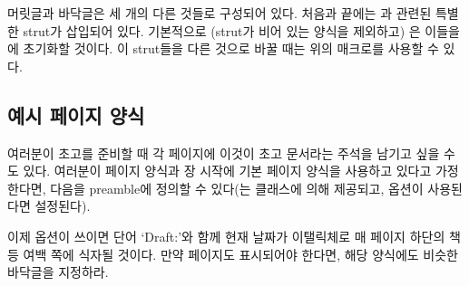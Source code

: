 \begin{syntax}
  \cmd{\makeheadfootstrut}
\end{syntax}
머릿글과 바닥글은 세 개의 다른 것들로 구성되어 있다.
처음과 끝에는 과 관련된 특별한 strut가 삽입되어 있다.
기본적으로 (strut가 비어 있는  양식을 제외하고)
\cmd{\makepagestyle}은 이들을 \cmd{\strut}에 초기화할 것이다.
이 strut들을 다른 것으로 바꿀 때는 위의 매크로를 사용할 수 있다.



\subsection{예시 페이지 양식}

여러분이 초고를 준비할 때 각 페이지에 이것이
초고 문서라는 주석을 남기고 싶을 수도 있다.
여러분이  페이지 양식과 장 시작에 기본  페이지
양식을 사용하고 있다고 가정한다면, 다음을 preamble에 정의할 수
있다(는 클래스에 의해 제공되고,  옵션이 사용된다면
 설정된다).
\label{ex:draft.pagestyle}
\begin{lcode}
\ifdraftdoc
\fi
\end{lcode}
이제  옵션이 쓰이면 단어 `Draft:'와 함께 현재 날짜가 이탤릭체로 매
페이지 하단의 책 등 여백 쪽에 식자될 것이다.
만약  페이지도 표시되어야 한다면, 해당 양식에도 비슷한 바닥글을
지정하라.

